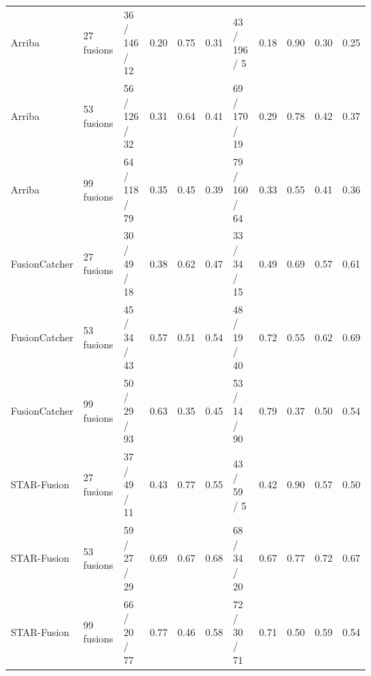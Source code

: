\begin{table}[!htbp]
{\begin{tabular}{lllccclcccc}
\midrule
Arriba & 27 fusions & 36 / 146 / 12 & 0.20 & 0.75 & 0.31 & 43 / 196 / 5 & 0.18 & 0.90 & 0.30 & 0.25 \\
Arriba & 53 fusions & 56 / 126 / 32 & 0.31 & 0.64 & 0.41 & 69 / 170 / 19 & 0.29 & 0.78 & 0.42 & 0.37 \\
Arriba & 99 fusions & 64 / 118 / 79 & 0.35 & 0.45 & 0.39 & 79 / 160 / 64 & 0.33 & 0.55 & 0.41 & 0.36 \\
FusionCatcher & 27 fusions & 30 / 49 / 18 & 0.38 & 0.62 & 0.47 & 33 / 34 / 15 & 0.49 & 0.69 & 0.57 & 0.61 \\
FusionCatcher & 53 fusions & 45 / 34 / 43 & 0.57 & 0.51 & 0.54 & 48 / 19 / 40 & 0.72 & 0.55 & 0.62 & 0.69 \\
FusionCatcher & 99 fusions & 50 / 29 / 93 & 0.63 & 0.35 & 0.45 & 53 / 14 / 90 & 0.79 & 0.37 & 0.50 & 0.54 \\
STAR-Fusion & 27 fusions & 37 / 49 / 11 & 0.43 & 0.77 & 0.55 & 43 / 59 / 5 & 0.42 & 0.90 & 0.57 & 0.50 \\
STAR-Fusion & 53 fusions & 59 / 27 / 29 & 0.69 & 0.67 & 0.68 & 68 / 34 / 20 & 0.67 & 0.77 & 0.72 & 0.67 \\
STAR-Fusion & 99 fusions & 66 / 20 / 77 & 0.77 & 0.46 & 0.58 & 72 / 30 / 71 & 0.71 & 0.50 & 0.59 & 0.54 \\
\bottomrule
\end{tabular}}
\end{table}
